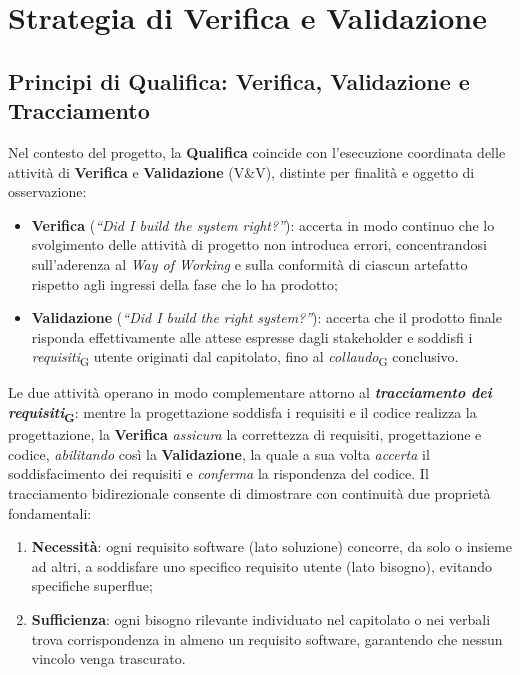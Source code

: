 \documentclass[11pt, a4paper]{article}
\newcommand{\glossario}[1]{\textit{#1}\textsubscript{G}}
\begin{document}
\section{Strategia di Verifica e Validazione}

\subsection{Principi di Qualifica: Verifica, Validazione e Tracciamento}
Nel contesto del progetto, la \textbf{Qualifica} coincide con l'esecuzione coordinata delle attività di \textbf{Verifica} e \textbf{Validazione} (V\&V), distinte per finalità e oggetto di osservazione:
\begin{itemize}
    \item \textbf{Verifica} (\textit{``Did I build the system right?''}): accerta in modo continuo che lo svolgimento delle attività di progetto non introduca errori, concentrandosi sull'aderenza al \textit{Way of Working} e sulla conformità di ciascun artefatto rispetto agli ingressi della fase che lo ha prodotto;
    \item \textbf{Validazione} (\textit{``Did I build the right system?''}): accerta che il prodotto finale risponda effettivamente alle attese espresse dagli stakeholder e soddisfi i \glossario{requisiti} utente originati dal capitolato, fino al \glossario{collaudo} conclusivo.
\end{itemize}

Le due attività operano in modo complementare attorno al \textbf{\glossario{tracciamento dei requisiti}}: mentre la progettazione soddisfa i requisiti e il codice realizza la progettazione, la \textbf{Verifica} \textit{assicura} la correttezza di requisiti, progettazione e codice, \textit{abilitando} così la \textbf{Validazione}, la quale a sua volta \textit{accerta} il soddisfacimento dei requisiti e \textit{conferma} la rispondenza del codice. Il tracciamento bidirezionale consente di dimostrare con continuità due proprietà fondamentali:
\begin{enumerate}
    \item \textbf{Necessità}: ogni requisito software (lato soluzione) concorre, da solo o insieme ad altri, a soddisfare uno specifico requisito utente (lato bisogno), evitando specifiche superflue;
    \item \textbf{Sufficienza}: ogni bisogno rilevante individuato nel capitolato o nei verbali trova corrispondenza in almeno un requisito software, garantendo che nessun vincolo venga trascurato.
\end{enumerate}
\end{document}
